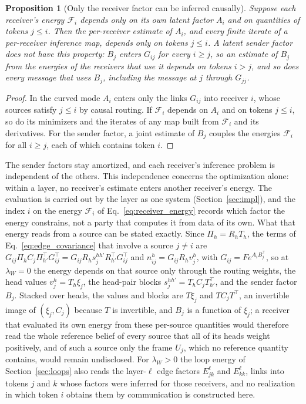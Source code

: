 \documentclass[11pt]{article}
\newtheorem{proposition}[theorem]{Proposition}
\theoremstyle{definition}
\theoremstyle{remark}
\begin{document}
\begin{proposition}[Only the receiver factor can be inferred causally]
\label{prop:causal_receiver}
Suppose each receiver's energy $\mathcal F_i$ depends only on its own latent factor $A_i$ and on quantities of tokens $j\le i$. Then the per-receiver estimate of $A_i$, and every finite iterate of a per-receiver inference map, depends only on tokens $j\le i$. A latent sender factor does not have this property: $B_j$ enters $G_{ij}$ for every $i\ge j$, so an estimate of $B_j$ from the energies of the receivers that use it depends on tokens $i>j$, and so does every message that uses $B_j$, including the message at $j$ through $G_{jj}$.
\end{proposition}
\begin{proof}
In the curved mode $A_i$ enters only the links $G_{ij}$ into receiver $i$, whose sources satisfy $j\le i$ by causal routing. If $\mathcal F_i$ depends on $A_i$ and on tokens $j\le i$, so do its minimizers and the iterates of any map built from $\mathcal F_i$ and its derivatives. For the sender factor, a joint estimate of $B_j$ couples the energies $\mathcal F_i$ for all $i\ge j$, each of which contains token $i$.
\end{proof}

The sender factors stay amortized, and each receiver's inference problem is independent of the others. This independence concerns the optimization alone: within a layer, no receiver's estimate enters another receiver's energy. The evaluation is carried out by the layer as one system (Section~\ref{sec:impl}), and the index $i$ on the energy $\mathcal F_i$ of Eq.~\eqref{eq:receiver_energy} records which factor the energy constrains, not a party that computes it from data of its own. What that energy reads from a source can be stated exactly. Since $\Pi_h=R_hT_h$, the terms of Eq.~\eqref{eq:edge_covariance} that involve a source $j\ne i$ are $G_{ij}\Pi_hC_j\Pi_{h'}^\top G_{ij}^\top=G_{ij}R_hs_j^{hh'}R_{h'}^\top G_{ij}^\top$ and $n_{ij}^h=G_{ij}R_hv_j^h$, with $G_{ij}=Fe^{A_iB_j^\top}$, so at $\lambda_W=0$ the energy depends on that source only through the routing weights, the head values $v_j^h=T_h\xi_j$, the head-pair blocks $s_j^{hh'}=T_hC_jT_{h'}^\top$, and the sender factor $B_j$. Stacked over heads, the values and blocks are $T\xi_j$ and $TC_jT^\top$, an invertible image of $(\xi_j,C_j)$ because $T$ is invertible, and $B_j$ is a function of $\xi_j$; a receiver that evaluated its own energy from these per-source quantities would therefore read the whole reference belief of every source that all of its heads weight positively, and of such a source only the frame $U_j$, which no reference quantity contains, would remain undisclosed. For $\lambda_W>0$ the loop energy of Section~\ref{sec:loops} also reads the layer-$\ell$ edge factors $E_{jk}^\ell$ and $E_{kk}^\ell$, links into tokens $j$ and $k$ whose factors were inferred for those receivers, and no realization in which token $i$ obtains them by communication is constructed here.
\end{document}
